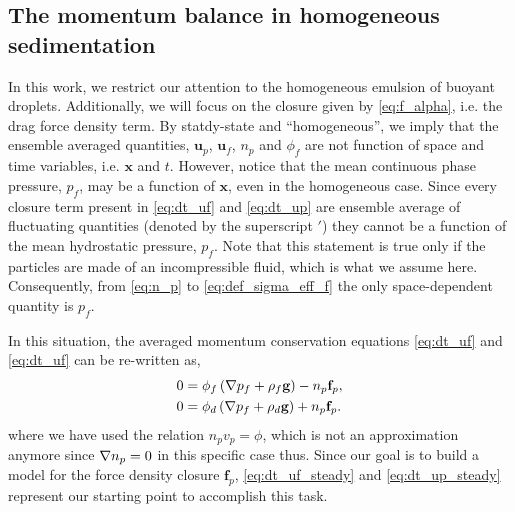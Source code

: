 \subsection{ The momentum balance in homogeneous sedimentation}

In this work, we restrict our attention to the homogeneous emulsion of buoyant droplets. 
Additionally, we will focus on the closure given by \ref{eq:f_alpha}, i.e. the drag force density term. 
By statdy-state and ``homogeneous'', we imply that the ensemble averaged quantities, $\textbf{u}_p$, $\textbf{u}_f$, $n_p$ and $\phi_f$ are not function of space and time variables, i.e. $\textbf{x}$ and $t$. 
However, notice that the mean continuous phase pressure, $p_f$, may be a function of $\textbf{x}$, even in the homogeneous case. 
Since every closure term present in \ref{eq:dt_uf} and \ref{eq:dt_up} are ensemble average of fluctuating quantities (denoted by the superscript $'$) they cannot be a function of the mean hydrostatic pressure, $p_f$.
Note that this statement is true only if the particles are made of an incompressible fluid, which is what we assume here. 
Consequently, from \ref{eq:n_p} to \ref{eq:def_sigma_eff_f} the only space-dependent quantity is $p_f$. 

In this situation, the averaged momentum conservation equations \ref{eq:dt_uf} and \ref{eq:dt_uf} can be re-written as, 
\begin{align}
    0 
    &= \phi_f 
    \left(\grad p_f
    + \rho_f \textbf{g}\right)
    - n_p \textbf{f}_p, 
    \label{eq:dt_uf_steady}
    \\
    0
    &= 
    \phi_d \left(\grad p_f
    + \rho_d \textbf{g}\right)
    + n_p \textbf{f}_p. 
    \label{eq:dt_up_steady}
\end{align}
where we have used the relation $n_p v_p = \phi$, which is not an approximation anymore since $\mathbf{\nabla} n_p = 0$ in this specific case thus.
Since our goal is to build a model for the force density closure $\textbf{f}_p$, \ref{eq:dt_uf_steady} and \ref{eq:dt_up_steady} represent our starting point to accomplish this task. 



